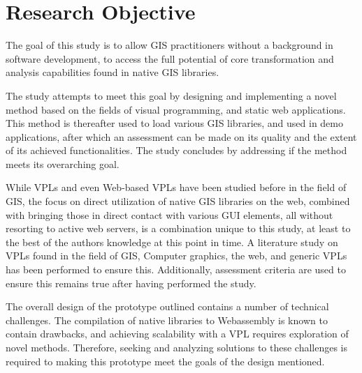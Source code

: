 \section{Research Objective}


The goal of this study is to allow \ac{GIS} practitioners without a background in software development, to access the full potential of core transformation and analysis capabilities found in native \ac{GIS} libraries.

The study attempts to meet this goal by designing and implementing a novel \\ method based on the fields of visual programming, and static web applications. 
This method is thereafter used to load various \ac{GIS} libraries, and used in demo applications, after which an assessment can be made on its quality and the extent of its achieved functionalities. 
The study concludes by addressing if the method meets its overarching goal.


While VPLs and even Web-based VPLs have been studied before in the field of \ac{GIS}, the focus on direct utilization of native \ac{GIS} libraries on the web, combined with bringing those in direct contact with various \ac{GUI} elements, all without resorting to active web servers, is a combination unique to this study, at least to the best of the authors knowledge at this point in time. 
A literature study on \ac{VPL}s found in the field of \ac{GIS}, Computer graphics, the web, and generic VPLs has been performed to ensure this.
Additionally, assessment criteria are used to ensure this remains true after having performed the study.

The overall design of the prototype outlined contains a number of technical challenges.
The compilation of native libraries to Webassembly is known to contain drawbacks, and achieving scalability with a VPL requires exploration of novel methods. 
Therefore, seeking and analyzing solutions to these challenges is required to making this prototype meet the goals of the design mentioned. 

